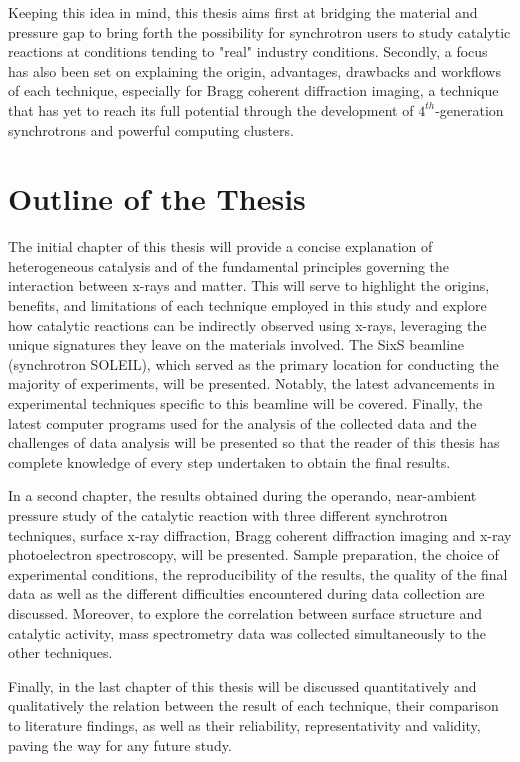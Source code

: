 Keeping this idea in mind, this thesis aims first at bridging the material and pressure gap to bring forth the possibility for synchrotron users to study catalytic reactions at conditions tending to "real" industry conditions.
Secondly, a focus has also been set on explaining the origin, advantages, drawbacks and workflows of each technique, especially for Bragg coherent diffraction imaging, a technique that has yet to reach its full potential through the development of $4^{th}$-generation synchrotrons and powerful computing clusters.

\section{Outline of the Thesis}

The initial chapter of this thesis will provide a concise explanation of heterogeneous catalysis and of the fundamental principles governing the interaction between x-rays and matter.
This will serve to highlight the origins, benefits, and limitations of each technique employed in this study and explore how catalytic reactions can be indirectly observed using x-rays, leveraging the unique signatures they leave on the materials involved.
The SixS beamline (synchrotron SOLEIL), which served as the primary location for conducting the majority of experiments, will be presented.
Notably, the latest advancements in experimental techniques specific to this beamline will be covered.
Finally, the latest computer programs used for the analysis of the collected data and the challenges of data analysis will be presented so that the reader of this thesis has complete knowledge of every step undertaken to obtain the final results.

In a second chapter, the results obtained during the operando, near-ambient pressure study of the catalytic reaction with three different synchrotron techniques, surface x-ray diffraction, Bragg coherent diffraction imaging and x-ray photoelectron spectroscopy, will be presented.
Sample preparation, the choice of experimental conditions, the reproducibility of the results, the quality of the final data as well as the different difficulties encountered during data collection are discussed.
Moreover, to explore the correlation between surface structure and catalytic activity, mass spectrometry data was collected simultaneously to the other techniques.

Finally, in the last chapter of this thesis will be discussed quantitatively and qualitatively the relation between the result of each technique, their comparison to literature findings, as well as their reliability, representativity and validity, paving the way for any future study.